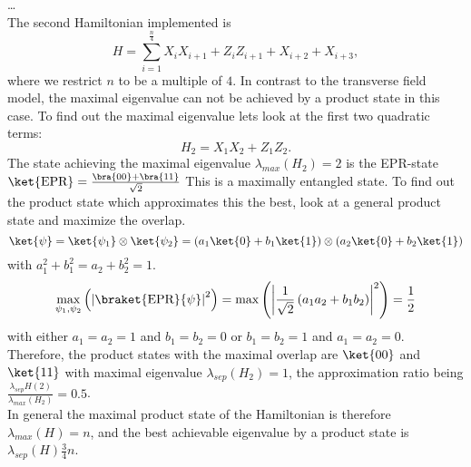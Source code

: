 \ldots\\
The second Hamiltonian implemented is \[
	H = \sum_{i=1}^{\frac{n}{4}} X_iX_{i+1}+Z_iZ_{i+1}+X_{i+2}+X_{i+3},
\]
where we restrict $n$ to be a multiple of $4$.
In contrast to the transverse field model, the maximal eigenvalue can not be achieved by a product state in this case.
To find out the maximal eigenvalue lets look at the first two quadratic terms:
\[
H_2=X_1X_2+Z_1Z_2
.\]
The state achieving the maximal eigenvalue $\lambda_{max}(H_2)=2$ is the EPR-state $\ket{\text{EPR}}=\frac{\bra{00}+\bra{11}}{\sqrt{2}}$
This is a maximally entangled state.
To find out the product state which approximates this the best, look at a general product state and maximize the overlap.
\[
	\ket{\psi}=\ket{\psi_1}\otimes\ket{\psi_2}=\left(a_1\ket{0}+b_1\ket{1}\right)\otimes\left(a_2\ket{0}+b_2\ket{1}\right)
\] with $a_1^2+b_1^2=a_2+b_2^2=1$.
\[
\max_{\psi_1,\psi_2}\left(\left|\braket{\text{EPR}}{\psi}\right|^2\right)=\max\left(\left|\frac{1}{\sqrt{2}}\left(a_1a_2+b_1b_2\right)\right|^2\right)=\frac{1}{2}
\]
with either $a_1=a_2=1$ and $b_1=b_2=0$ or $b_1=b_2=1$ and $a_1=a_2=0$.
Therefore, the product states with the maximal overlap are $\ket{00}$ and $\ket{11}$ with maximal eigenvalue $\lambda_{sep}(H_2)=1$, the approximation ratio being  $\frac{\lambda_{sep}H(2)}{\lambda_{max}(H_2)} = 0.5$.\\
In general the maximal product state of the Hamiltonian is therefore $\lambda_{max}(H)=n$, and the best achievable eigenvalue by a product state is $\lambda_{sep}(H)\frac{3}{4}n$.
